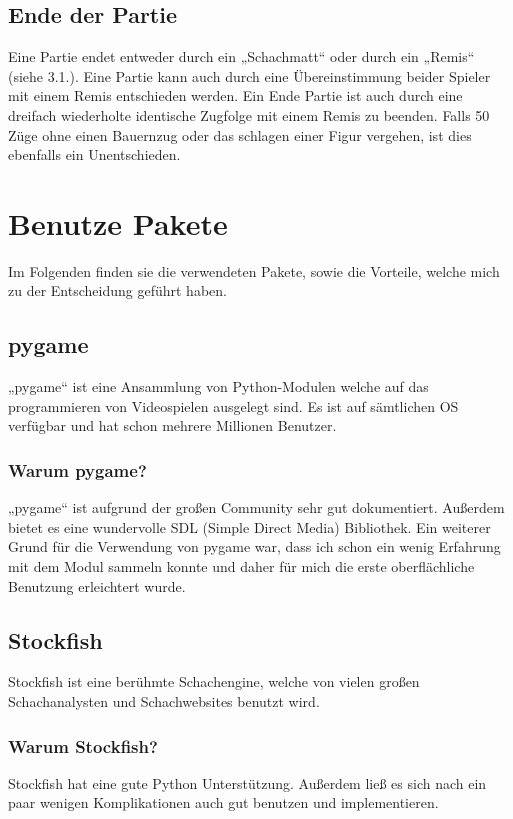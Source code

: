 \documentclass[a4paper, 10pt]{scrartcl}
\begin{document}
\subsection{Ende der Partie}
Eine Partie endet entweder durch ein „Schachmatt“ oder durch ein „Remis“ (siehe 3.1.).
Eine Partie kann auch durch eine Übereinstimmung beider Spieler mit einem Remis entschieden werden. 
Ein Ende Partie ist auch durch eine dreifach wiederholte identische Zugfolge mit einem Remis zu beenden. 
Falls 50 Züge ohne einen Bauernzug oder das schlagen einer Figur vergehen, ist dies ebenfalls ein Unentschieden.

\section{Benutze Pakete}
Im Folgenden finden sie die verwendeten Pakete, sowie die Vorteile, welche mich zu der Entscheidung geführt haben.

\subsection{pygame}
„pygame“ ist eine Ansammlung von Python-Modulen welche auf das programmieren von Videospielen ausgelegt sind. Es ist auf sämtlichen OS verfügbar und hat schon mehrere Millionen Benutzer.

\subsubsection{Warum pygame?}
„pygame“ ist aufgrund der großen Community sehr gut dokumentiert. Außerdem bietet es eine wundervolle SDL (Simple Direct Media) Bibliothek. Ein weiterer Grund für die Verwendung von pygame war, dass ich schon ein wenig Erfahrung mit dem Modul sammeln konnte und daher für mich die erste oberflächliche Benutzung erleichtert wurde. 

\subsection{Stockfish}
Stockfish ist eine berühmte Schachengine, welche von vielen großen Schachanalysten und Schachwebsites benutzt wird.

\subsubsection{Warum Stockfish?}
Stockfish hat eine gute Python Unterstützung. Außerdem ließ es sich nach ein paar wenigen Komplikationen auch gut benutzen und implementieren.
\end{document}
